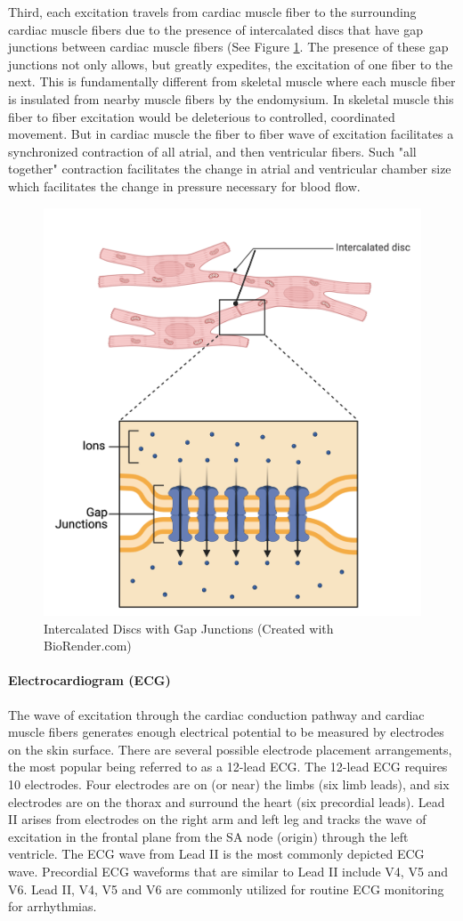 Third, each excitation travels from cardiac muscle fiber to the surrounding cardiac muscle fibers due to the presence of intercalated discs that have gap junctions between cardiac muscle fibers (See Figure \ref{fig:Cardiac_Gap_Junctions}. The presence of these gap junctions not only allows, but greatly expedites, the excitation of one fiber to the next. This is fundamentally different from skeletal muscle where each muscle fiber is insulated from nearby muscle fibers by the endomysium. In skeletal muscle this fiber to fiber excitation would be deleterious to controlled, coordinated movement. But in cardiac muscle the fiber to fiber wave of excitation facilitates a synchronized contraction of all atrial, and then ventricular fibers. Such "all together" contraction facilitates the change in atrial and ventricular chamber size which facilitates the change in pressure necessary for blood flow.

\begin{figure}[!h]
    \centering
    \includegraphics[width=0.5\linewidth]{./figure/Cardiac_Gap_Junctions.png}
    \caption{Intercalated Discs with Gap Junctions \footnotesize{(Created with BioRender.com)}}
    \label{fig:Cardiac_Gap_Junctions}
\end{figure}

\paragraph{Electrocardiogram (ECG)}

The wave of excitation through the cardiac conduction pathway and cardiac muscle fibers generates enough electrical potential to be measured by electrodes on the skin surface. There are several possible electrode placement arrangements, the most popular being referred to as a 12-lead ECG. The 12-lead ECG requires 10 electrodes. Four electrodes are on (or near) the limbs (six limb leads), and six electrodes are on the thorax and surround the heart (six precordial leads). Lead II arises from electrodes on the right arm and left leg and tracks the wave of excitation in the frontal plane from the SA node (origin) through the left ventricle. The ECG wave from Lead II is the most commonly depicted ECG wave. Precordial ECG waveforms that are similar to Lead II include V4, V5 and V6.  Lead II, V4, V5 and V6 are commonly utilized for routine ECG monitoring for arrhythmias. 

